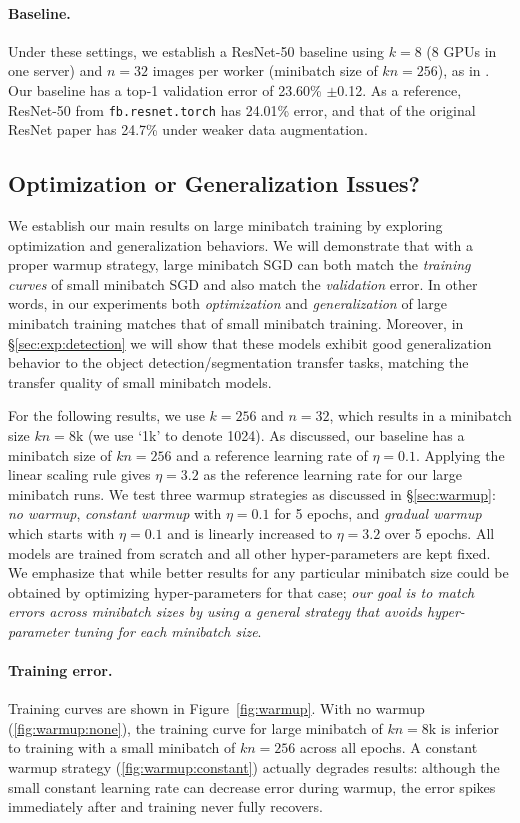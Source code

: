 \documentclass[10pt,twocolumn,letterpaper]{article}
\newcommand{\symb}[1]{{\small\texttt{#1}}\xspace}
\begin{document}
\paragraph{Baseline.} Under these settings, we establish a ResNet-50 baseline using $k=8$ (8 GPUs in one server) and $n=32$ images per worker (minibatch size of $kn=256$), as in \cite{He2016}. Our baseline has a top-1 validation error of 23.60\% $\pm$0.12. As a reference, ResNet-50 from \symb{fb.resnet.torch} \cite{Gross2016} has 24.01\% error, and that of the original ResNet paper \cite{He2016} has 24.7\% under weaker data augmentation.

\subsection{Optimization or Generalization Issues?}\label{sec:exp:optimization}
We establish our main results on large minibatch training by exploring optimization and generalization behaviors. We will demonstrate that with a proper warmup strategy, large minibatch SGD can both match the \emph{training curves} of small minibatch SGD and also match the \emph{validation} error. In other words, in our experiments both \emph{optimization} and \emph{generalization} of large minibatch training matches that of small minibatch training. Moreover, in \S\ref{sec:exp:detection} we will show that these models exhibit good generalization behavior to the object detection/segmentation transfer tasks, matching the transfer quality of small minibatch models.

For the following results, we use $k=256$ and $n=32$, which results in a minibatch size $kn=8$k (we use `1k' to denote 1024). As discussed, our baseline has a minibatch size of $kn=256$ and a reference learning rate of $\eta=0.1$. Applying the linear scaling rule gives $\eta=3.2$ as the reference learning rate for our large minibatch runs. We test three warmup strategies as discussed in \S\ref{sec:warmup}: \emph{no warmup}, \emph{constant warmup} with $\eta=0.1$ for 5 epochs, and \emph{gradual warmup} which starts with $\eta=0.1$ and is linearly increased to $\eta=3.2$ over 5 epochs. All models are trained from scratch and all other hyper-parameters are kept fixed. We emphasize that while better results for any particular minibatch size could be obtained by optimizing hyper-parameters for that case; \emph{our goal is to match errors across minibatch sizes by using a general strategy that avoids hyper-parameter tuning for each minibatch size}.

\paragraph{Training error.} Training curves are shown in Figure~\ref{fig:warmup}. With no warmup (\ref{fig:warmup:none}), the training curve for large minibatch of $kn=8$k is inferior to training with a small minibatch of $kn=256$ across all epochs. A constant warmup strategy (\ref{fig:warmup:constant}) actually degrades results: although the small constant learning rate can decrease error during warmup, the error spikes immediately after and training never fully recovers.
\end{document}

